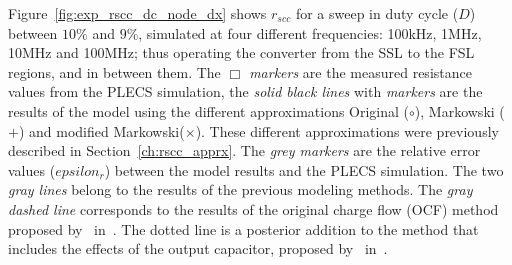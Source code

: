 Figure~\ref{fig:exp_rscc_dc_node_dx} shows $r_{scc}$ for a sweep in duty cycle ($D$) between $10\%$ and $9\%$, simulated at four different frequencies: 100kHz, 1MHz, 10MHz and 100MHz; thus operating the converter from the SSL to the FSL regions, and in between them. The \emph{$\Box$ markers} are the measured resistance values from the PLECS simulation, the \emph{solid black lines} with \emph{markers}  are the results of the model using the different approximations Original ($\circ$), Markowski ($+$) and modified Markowski($\times$). These different approximations were previously described in Section~\ref{ch:rscc_apprx}. The \emph{grey markers} are the relative error values ($epsilon_r$) between the model results and the PLECS simulation.  The two \emph{gray lines} belong to the results of the previous modeling methods. The \emph{gray dashed line}  corresponds to the results of the original charge flow (OCF) method~\cite{95Makowski} proposed  by~\citeauthor{95Makowski} in~\citeyear{95Makowski}. The dotted line is a posterior addition to the method that includes the effects of the output capacitor, proposed by~\citeauthor{2013Breussegem:c_out} in~\cite{2013Breussegem:c_out}.


